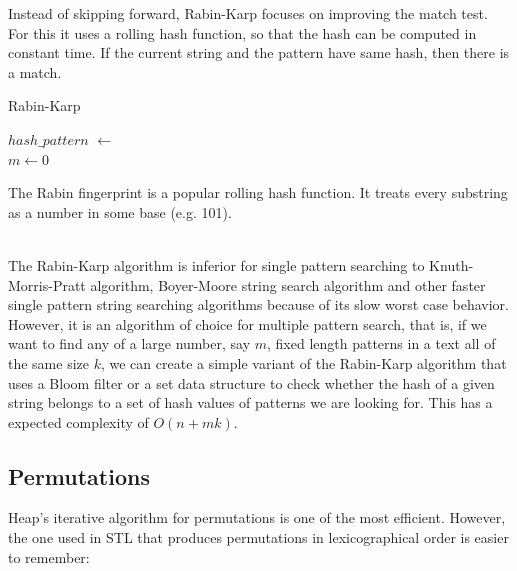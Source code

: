 \documentclass[a4paper, 12pt]{article}
\begin{document}
Instead of skipping forward, Rabin-Karp focuses on improving the match test. For this it uses a rolling hash function, so that the hash can be computed in constant time. If the current string and the pattern have same hash, then there is a match.

\vspace{0.5cm}
\IncMargin{2em}
\begin{algorithm}[H]
\caption{Rabin-Karp}
\vspace{0.1cm}
\Indm
\Indp
\vspace{0.1cm}
$hash\_pattern$ $\gets$ \\
$m \gets 0$\\
\end{algorithm}
\DecMargin{2em}
\vspace{0.5cm}

The Rabin fingerprint is a popular rolling hash function. It treats every substring as a number in some base (e.g. 101).

~\\
The Rabin-Karp algorithm is inferior for single pattern searching to Knuth-Morris-Pratt algorithm, Boyer-Moore string search algorithm and other faster single pattern string searching algorithms because of its slow worst case behavior. However, it is an algorithm of choice for multiple pattern search, that is, if we want to find any of a large number, say $m$, fixed length patterns in a text all of the same size $k$, we can create a simple variant of the Rabin-Karp algorithm that uses a Bloom filter or a set data structure to check whether the hash of a given string belongs to a set of hash values of patterns we are looking for. This has a expected complexity of $O(n + mk)$.

  \subsection{Permutations}

Heap's iterative algorithm for permutations is one of the most efficient. However, the one used in STL that produces permutations in lexicographical order is easier to remember:
\end{document}
